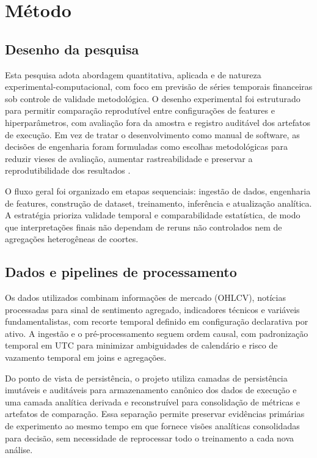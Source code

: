 \chapter{Método}


\section{Desenho da pesquisa}
Esta pesquisa adota abordagem quantitativa, aplicada e de natureza experimental-computacional, com foco em previsão de séries temporais financeiras sob controle de validade metodológica. O desenho experimental foi estruturado para permitir comparação reprodutível entre configurações de features e hiperparâmetros, com avaliação fora da amostra e registro auditável dos artefatos de execução. Em vez de tratar o desenvolvimento como manual de software, as decisões de engenharia foram formuladas como escolhas metodológicas para reduzir vieses de avaliação, aumentar rastreabilidade e preservar a reprodutibilidade dos resultados \cite{PINEAU2021REPRODUCIBILITY}.

O fluxo geral foi organizado em etapas sequenciais: ingestão de dados, engenharia de features, construção de dataset, treinamento, inferência e atualização analítica. A estratégia prioriza validade temporal e comparabilidade estatística, de modo que interpretações finais não dependam de reruns não controlados nem de agregações heterogêneas de coortes.

\section{Dados e pipelines de processamento}
Os dados utilizados combinam informações de mercado (OHLCV), notícias processadas para sinal de sentimento agregado, indicadores técnicos e variáveis fundamentalistas, com recorte temporal definido em configuração declarativa por ativo. A ingestão e o pré-processamento seguem ordem causal, com padronização temporal em UTC para minimizar ambiguidades de calendário e risco de vazamento temporal em joins e agregações.

Do ponto de vista de persistência, o projeto utiliza camadas de persistência imutáveis e auditáveis para armazenamento canônico dos dados de execução e uma camada analítica derivada e reconstruível para consolidação de métricas e artefatos de comparação. Essa separação permite preservar evidências primárias de experimento ao mesmo tempo em que fornece visões analíticas consolidadas para decisão, sem necessidade de reprocessar todo o treinamento a cada nova análise.

